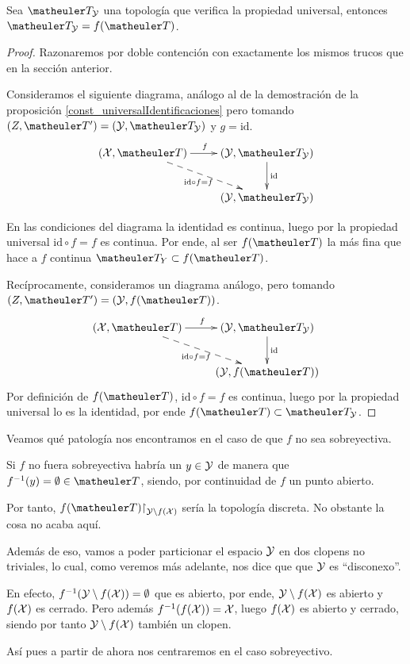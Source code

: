 \begin{prop}
	Sea $\T_\Y$ una topología que verifica la propiedad universal, entonces $\T_\Y=f(\T)$.
\end{prop}
\begin{proof}
	Razonaremos por doble contención con exactamente los mismos trucos que en la sección anterior.
	
	Consideramos el siguiente diagrama, análogo al de la demostración de la proposición \ref{const_universalIdentificaciones} pero tomando $(Z,\T')=(\Y,\T_\Y)$ y $g=\text{id}$.
	\begin{equation*}
	\xymatrix{
		(\X,\T)\ar[r]^{f}\ar@{-->}[rd]_{\text{id}\circ f=f}&(\Y,\T_\Y)\ar[d]^{\text{id}}\\
		&(\Y,\T_\Y)
	}
	\end{equation*}
	
	En las condiciones del diagrama la identidad es continua, luego por la propiedad universal $\text{id}\circ f=f$ es continua. Por ende, al ser $f(\T)$ la más fina que hace a $f$ continua $\T_Y\subset f(\T)$.
	
	Recíprocamente, consideramos un diagrama análogo, pero tomando $(Z,\T')=(\Y,f(\T))$.  
	\begin{equation*}
	\xymatrix{
		(\X,\T)\ar[r]^{f}\ar@{-->}[rd]_{\text{id}\circ f=f}&(\Y,\T_\Y)\ar[d]^{\text{id}}\\
		&(\Y,f(\T))
	}
	\end{equation*}
	Por definición de $f(\T)$, $\text{id}\circ f=f$ es continua, luego por la propiedad universal lo es la identidad, por ende $f(\T)\subset \T_\Y$.
\end{proof}
\begin{obs}[Sobreyectividad]
	Veamos qué patología nos encontramos en el caso de que $f$ no sea sobreyectiva.
	
	Si $f$ no fuera sobreyectiva habría un $y\in\mathcal{Y}$ de manera que $f^{-1}(y)=\emptyset\in\T$, siendo, por continuidad de $f$ un punto abierto.
	
	Por tanto, $f(\T)\restriction_{\Y\setminus f(\X)}$ sería la topología discreta. No obstante la cosa no acaba aquí.
	
	Además de eso, vamos a poder particionar el espacio $\mathcal{Y}$ en dos clopens no triviales, lo cual, como veremos más adelante, nos dice que que $\mathcal{Y}$ es ``disconexo''.
	
	En efecto, $f^{-1}(\mathcal{Y}\setminus f(\mathcal{X}))=\emptyset$ que es abierto, por ende, $\mathcal{Y}\setminus f(\mathcal{X})$ es abierto y $f(\mathcal{X})$ es cerrado. Pero además $f^{-1}(f(\mathcal{X}))=\mathcal{X}$, luego $f(\mathcal{X})$ es abierto y cerrado, siendo por tanto $\mathcal{Y}\setminus f(\mathcal{X})$ también un clopen. 
\end{obs}
Así pues a partir de ahora nos centraremos en el caso sobreyectivo.

